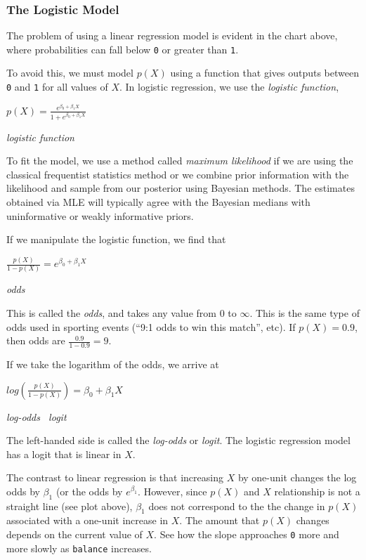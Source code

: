\documentclass[
]{article}
\begin{document}
\hypertarget{the-logistic-model}{%
\subsubsection{The Logistic Model}\label{the-logistic-model}}

The problem of using a linear regression model is evident in the chart
above, where probabilities can fall below \texttt{0} or greater than
\texttt{1}.

To avoid this, we must model \(p(X)\) using a function that gives
outputs between \texttt{0} and \texttt{1} for all values of \(X\). In
logistic regression, we use the \emph{logistic function},

\(p(X) = \frac{e^{\beta_0+\beta_1X}}{1+e^{\beta_0+\beta_1X}}\)

\emph{logistic function}

To fit the model, we use a method called \emph{maximum likelihood} if we
are using the classical frequentist statistics method or we combine
prior information with the likelihood and sample from our posterior
using Bayesian methods. The estimates obtained via MLE will typically
agree with the Bayesian medians with uninformative or weakly informative
priors.

If we manipulate the logistic function, we find that

\(\frac{p(X)}{1-p(X)} = e^{\beta_0+\beta_1X}\)

\emph{odds}

This is called the \emph{odds}, and takes any value from \(0\) to
\(\infty\). This is the same type of odds used in sporting events (``9:1
odds to win this match'', etc). If \(p(X) = 0.9\), then odds are
\(\frac{0.9}{1-0.9} = 9\).

If we take the logarithm of the odds, we arrive at

\(log(\frac{p(X)}{1-p(X)}) = \beta_0+\beta_1X\)

\emph{log-odds ~logit}

The left-handed side is called the \emph{log-odds} or \emph{logit}. The
logistic regression model has a logit that is linear in \(X\).

The contrast to linear regression is that increasing \(X\) by one-unit
changes the log odds by \(\beta_1\) (or the odds by \(e^{\beta_1}\).
However, since \(p(X)\) and \(X\) relationship is not a straight line
(see plot above), \(\beta_1\) does not correspond to the the change in
\(p(X)\) associated with a one-unit increase in \(X\). The amount that
\(p(X)\) changes depends on the current value of \(X\). See how the
slope approaches \texttt{0} more and more slowly as \texttt{balance}
increases.
\end{document}
